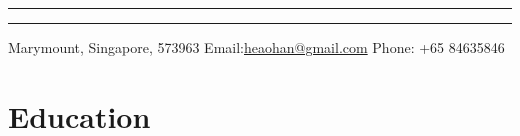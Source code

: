 \documentclass[a4paper,12pt]{article} %
\begin{document}
\pagestyle{empty} %



\par{\bigskip\par} %
\hrule \vskip 0.5mm \hrule
\small{Marymount, Singapore, 573963 \hspace{1.2cm} Email:\href{mailto:heaohan@gmail.com}{heaohan@gmail.com}\hspace{1.2cm}  Phone: +65 84635846}

%


\section{Education}

%
%
\end{document}
